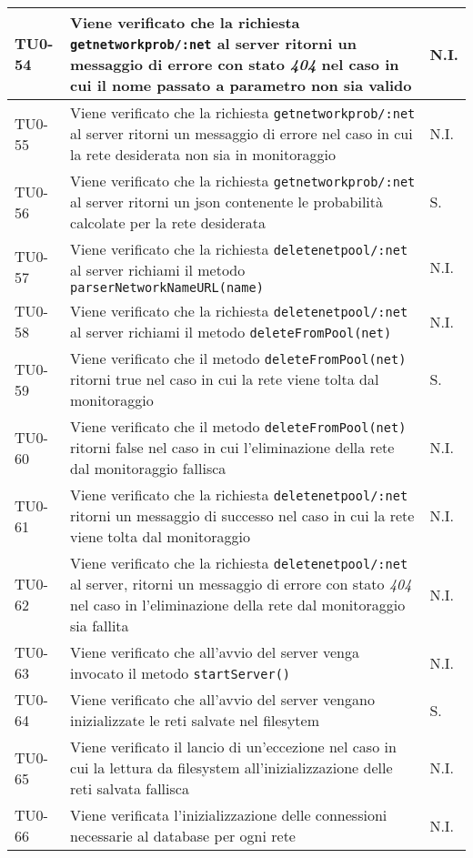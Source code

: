 \begin{longtable}{|C{.15\textwidth}|m{.66\textwidth}|C{.10\textwidth}|}
\hline 
TU0-54 & Viene verificato che la richiesta \texttt{getnetworkprob/:net} al server ritorni un messaggio di errore con stato \textit{404} nel caso in cui il nome passato a parametro non sia valido & N.I. \\ 
\hline
{} TU0-55 & Viene verificato che la richiesta \texttt{getnetworkprob/:net} al server ritorni un messaggio di errore nel caso in cui la rete desiderata non sia in monitoraggio & N.I. \\ 
\hline 
TU0-56 & Viene verificato che la richiesta \texttt{getnetworkprob/:net} al server ritorni un json contenente le probabilità calcolate per la rete desiderata & S. \\ 
\hline 
{} TU0-57 & Viene verificato che la richiesta \texttt{deletenetpool/:net} al server richiami il metodo \texttt{parserNetworkNameURL(name)} & N.I. \\ 
\hline
TU0-58 & Viene verificato che la richiesta \texttt{deletenetpool/:net} al server richiami il metodo \texttt{deleteFromPool(net)} & N.I. \\ 
\hline 
{} TU0-59 & Viene verificato che il metodo \texttt{deleteFromPool(net)} ritorni true nel caso in cui la rete viene tolta dal monitoraggio & S. \\ 
\hline
TU0-60 & Viene verificato che il metodo \texttt{deleteFromPool(net)} ritorni false nel caso in cui l'eliminazione della rete dal monitoraggio fallisca & N.I. \\ 
\hline 
{} TU0-61 & Viene verificato che la richiesta \texttt{deletenetpool/:net} ritorni un messaggio di successo nel caso in cui la rete viene tolta dal monitoraggio & N.I. \\ 
\hline 
TU0-62 & Viene verificato che la richiesta \texttt{deletenetpool/:net} al server, ritorni un messaggio di errore con stato \textit{404} nel caso in l'eliminazione della rete dal monitoraggio sia fallita & N.I. \\ 
\hline 
{} TU0-63 & Viene verificato che all'avvio del server venga invocato il metodo \texttt{startServer()} & N.I. \\ 
\hline
TU0-64 & Viene verificato che all'avvio del server vengano inizializzate le reti salvate nel filesytem & S. \\ 
\hline
{}TU0-65 & Viene verificato il lancio di un'eccezione nel caso in cui la lettura da filesystem all'inizializzazione delle reti salvata fallisca & N.I. \\ 
\hline
TU0-66 & Viene verificata l'inizializzazione delle connessioni necessarie al database per ogni rete & N.I. \\ 

\end{longtable}

